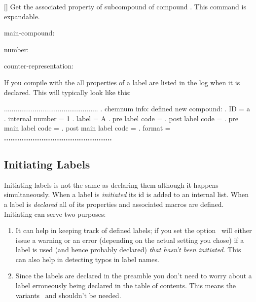 \documentclass[load-preamble+,babel-options={ngerman,british,american}]{cnltx-doc}
\begin{document}
\begin{commands}
  \expandable{}[]
    Get the associated property  of subcompound  of compound .  This command is
    expandable.
\end{commands}

\begin{example}
  \ttfamily
  main-compound: \par
  number: \par
  counter-representation: 
\end{example}

If you compile with the  all properties of a label are
listed in the log when it is declared.  This will typically look like this:

\begin{sourcecode}
  .................................................
  . chemnum info: defined new compound:
  .   ID = a
  .   internal number = 1
  .   label = A
  .   pre label code = 
  .   post label code = 
  .   pre main label code = 
  .   post main label code = 
  .   format = \bfseries 
  .................................................
\end{sourcecode}

\subsection{Initiating Labels}\label{sec:initiating-labels}
Initiating labels is not the same as declaring them although it happens
simultaneously.  When a label is \emph{initiated} its \ac{id} is added to an
internal list.  When a label is \emph{declared} all of its properties and
associated macros are defined.  Initiating can serve two purposes:
\begin{enumerate}
  \item It can help in keeping track of defined labels; if you set the option
     \chemnum\ will either issue a warning or an error (depending 
    on the actual setting you chose) if a label is used (and hence probably
    declared) \emph{that hasn't been initiated}.  This can also help in
    detecting typos in label names.
  \item Since the labels are declared in the preamble you don't need to worry
    about a label erroneously being declared in the table of contents.  This
    means the variants \sarg\ and \code{+} shouldn't be
    needed.
\end{enumerate}
\end{document}
